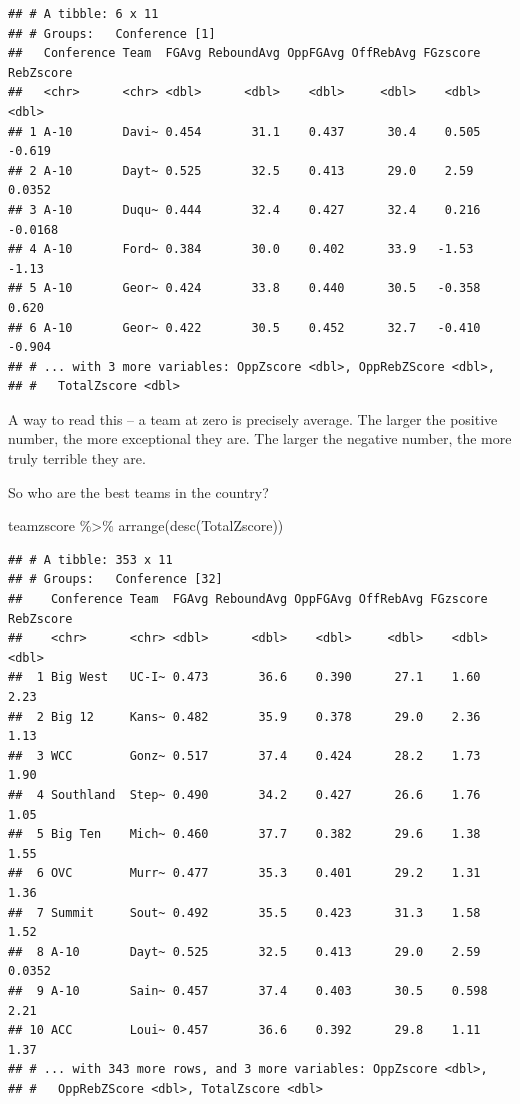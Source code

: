 \documentclass[
]{book}
\newenvironment{Shaded}{\begin{snugshade}}{\end{snugshade}}
\newcommand{\FunctionTok}[1]{\textcolor[rgb]{0.00,0.00,0.00}{#1}}
\newcommand{\NormalTok}[1]{#1}
\newcommand{\SpecialCharTok}[1]{\textcolor[rgb]{0.00,0.00,0.00}{#1}}
\begin{document}
\begin{verbatim}
## # A tibble: 6 x 11
## # Groups:   Conference [1]
##   Conference Team  FGAvg ReboundAvg OppFGAvg OffRebAvg FGzscore RebZscore
##   <chr>      <chr> <dbl>      <dbl>    <dbl>     <dbl>    <dbl>     <dbl>
## 1 A-10       Davi~ 0.454       31.1    0.437      30.4    0.505   -0.619 
## 2 A-10       Dayt~ 0.525       32.5    0.413      29.0    2.59     0.0352
## 3 A-10       Duqu~ 0.444       32.4    0.427      32.4    0.216   -0.0168
## 4 A-10       Ford~ 0.384       30.0    0.402      33.9   -1.53    -1.13  
## 5 A-10       Geor~ 0.424       33.8    0.440      30.5   -0.358    0.620 
## 6 A-10       Geor~ 0.422       30.5    0.452      32.7   -0.410   -0.904 
## # ... with 3 more variables: OppZscore <dbl>, OppRebZScore <dbl>,
## #   TotalZscore <dbl>
\end{verbatim}

A way to read this -- a team at zero is precisely average. The larger the positive number, the more exceptional they are. The larger the negative number, the more truly terrible they are.

So who are the best teams in the country?

\begin{Shaded}
\begin{Highlighting}[]
\NormalTok{teamzscore }\SpecialCharTok{\%\textgreater{}\%} \FunctionTok{arrange}\NormalTok{(}\FunctionTok{desc}\NormalTok{(TotalZscore))}
\end{Highlighting}
\end{Shaded}

\begin{verbatim}
## # A tibble: 353 x 11
## # Groups:   Conference [32]
##    Conference Team  FGAvg ReboundAvg OppFGAvg OffRebAvg FGzscore RebZscore
##    <chr>      <chr> <dbl>      <dbl>    <dbl>     <dbl>    <dbl>     <dbl>
##  1 Big West   UC-I~ 0.473       36.6    0.390      27.1    1.60     2.23  
##  2 Big 12     Kans~ 0.482       35.9    0.378      29.0    2.36     1.13  
##  3 WCC        Gonz~ 0.517       37.4    0.424      28.2    1.73     1.90  
##  4 Southland  Step~ 0.490       34.2    0.427      26.6    1.76     1.05  
##  5 Big Ten    Mich~ 0.460       37.7    0.382      29.6    1.38     1.55  
##  6 OVC        Murr~ 0.477       35.3    0.401      29.2    1.31     1.36  
##  7 Summit     Sout~ 0.492       35.5    0.423      31.3    1.58     1.52  
##  8 A-10       Dayt~ 0.525       32.5    0.413      29.0    2.59     0.0352
##  9 A-10       Sain~ 0.457       37.4    0.403      30.5    0.598    2.21  
## 10 ACC        Loui~ 0.457       36.6    0.392      29.8    1.11     1.37  
## # ... with 343 more rows, and 3 more variables: OppZscore <dbl>,
## #   OppRebZScore <dbl>, TotalZscore <dbl>
\end{verbatim}
\end{document}
